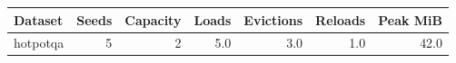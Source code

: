 \begin{tabular}{lrrrrrr}
\toprule
Dataset & Seeds & Capacity & Loads & Evictions & Reloads & Peak MiB \\
\midrule
hotpotqa & 5 & 2 & 5.0 & 3.0 & 1.0 & 42.0 \\ 
\bottomrule
\end{tabular}
